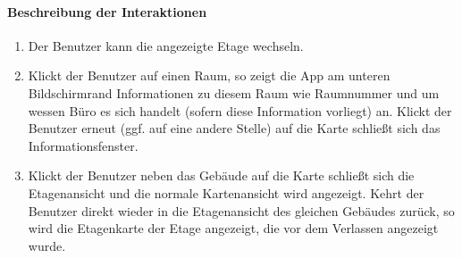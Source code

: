 \paragraph{Beschreibung der Interaktionen}
\begin{enumerate}
    \item Der Benutzer kann die angezeigte Etage wechseln.
    \item Klickt der Benutzer auf einen Raum, so zeigt die App am unteren Bildschirmrand Informationen zu diesem Raum wie Raumnummer und um wessen Büro es sich handelt (sofern diese Information vorliegt) an. Klickt der Benutzer erneut (ggf. auf eine andere Stelle) auf die Karte schließt sich das Informationsfenster.
    \item Klickt der Benutzer neben das Gebäude auf die Karte schließt sich die Etagenansicht und die normale Kartenansicht wird angezeigt. Kehrt der Benutzer direkt wieder in die Etagenansicht des gleichen Gebäudes zurück, so wird die Etagenkarte der Etage angezeigt, die vor dem Verlassen angezeigt wurde.
\end{enumerate}
